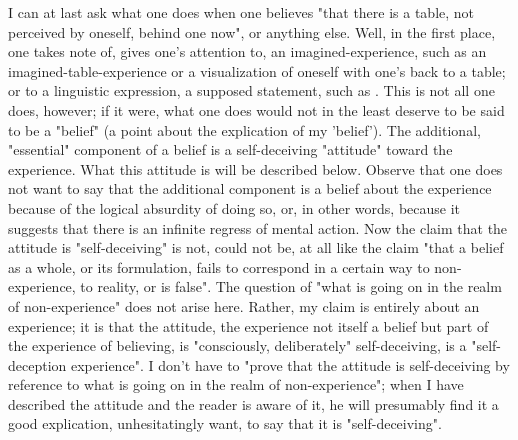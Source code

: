 \documentclass[10pt,twoside]{memoir}
\begin{document}
\begin{enumerate}
{I can at last ask what one does when one believes "that there is a table, 
not perceived by oneself, behind one now", or anything else. Well, in the 
first place, one takes note of, gives one's attention to, an 
imagined-experience, such as an imagined-table-experience or a visualization 
of oneself with one's back to a table; or to a linguistic expression, a supposed 
statement, such as . This is not all one does, 
however; if it were, what one does would not in the least deserve to be said 
to be a "belief" (a point about the explication of my 'belief'). The 
additional, "essential" component of a belief is a self-deceiving "attitude" 
toward the experience. What this attitude is will be described below. Observe 
that one does not want to say that the additional component is a belief 
about the experience because of the logical absurdity of doing so, or, in 
other words, because it suggests that there is an infinite regress of mental 
action. Now the claim that the attitude is "self-deceiving" is not, could not 
be, at all like the claim "that a belief as a whole, or its formulation, fails to 
correspond in a certain way to non-experience, to reality, or is false". The 
question of "what is going on in the realm of non-experience" does not arise 
here. Rather, my claim is entirely about an experience; it is that the attitude, 
the experience not itself a belief but part of the experience of believing, is 
"consciously, deliberately" self-deceiving, is a "self-deception experience". I 
don't have to "prove that the attitude is self-deceiving by reference to what 
is going on in the realm of non-experience"; when I have described the 
attitude and the reader is aware of it, he will presumably find it a good 
explication, unhesitatingly want, to say that it is "self-deceiving". 

}
\end{enumerate}
\end{document}

